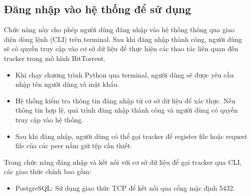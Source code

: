\subsection{Đăng nhập vào hệ thống để sử dụng}
Chức năng này cho phép người dùng đăng nhập vào hệ thống thông qua giao diện dòng lệnh (CLI) trên terminal. Sau khi đăng nhập thành công, người dùng sẽ có quyền truy cập vào cơ sở dữ liệu để thực hiện các thao tác liên quan đến tracker trong mô hình BitTorrent.
\begin{itemize}
    \item Khi chạy chương trình Python qua terminal, người dùng sẽ được yêu cầu nhập tên người dùng và mật khẩu.
    \item Hệ thống kiểm tra thông tin đăng nhập từ cơ sở dữ liệu để xác thực. Nếu thông tin hợp lệ, quá trình đăng nhập thành công và người dùng có quyền truy cập vào hệ thống.
    \item Sau khi đăng nhập, người dùng có thể gọi tracker để register file hoặc request file của các peer nắm giữ tệp cần thiết.
\end{itemize}
Trong chức năng đăng nhập và kết nối với cơ sở dữ liệu để gọi tracker qua CLI, các giao thức chính bao gồm:
\begin{itemize}
    \item PostgreSQL: Sử dụng giao thức TCP để kết nối qua cổng mặc định 5432.
\end{itemize}